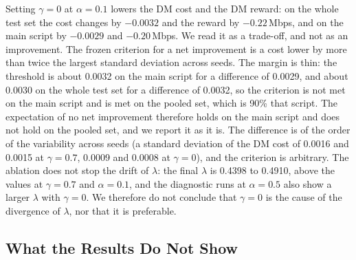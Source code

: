 Setting $\gamma=0$ at $\alpha=0.1$ lowers the DM cost and the DM reward: on the whole test set the cost changes by $-0.0032$ and the reward by $-0.22$\,Mbps, and on the main script by $-0.0029$ and $-0.20$\,Mbps.%
We read it as a trade-off, and not as an improvement.%
The frozen criterion for a net improvement is a cost lower by more than twice the largest standard deviation across seeds.%
The margin is thin: the threshold is about 0.0032 on the main script for a difference of 0.0029, and about 0.0030 on the whole test set for a difference of 0.0032, so the criterion is not met on the main script and is met on the pooled set, which is 90\% that script.%
The expectation of no net improvement therefore holds on the main script and does not hold on the pooled set, and we report it as it is.%
The difference is of the order of the variability across seeds (a standard deviation of the DM cost of 0.0016 and 0.0015 at $\gamma=0.7$, 0.0009 and 0.0008 at $\gamma=0$), and the criterion is arbitrary.%
The ablation does not stop the drift of $\lambda$: the final $\lambda$ is 0.4398 to 0.4910, above the values at $\gamma=0.7$ and $\alpha=0.1$, and the diagnostic runs at $\alpha=0.5$ also show a larger $\lambda$ with $\gamma=0$.%
We therefore do not conclude that $\gamma=0$ is the cause of the divergence of $\lambda$, nor that it is preferable.%

\subsection{What the Results Do Not Show}
\label{sec:claims_not}

